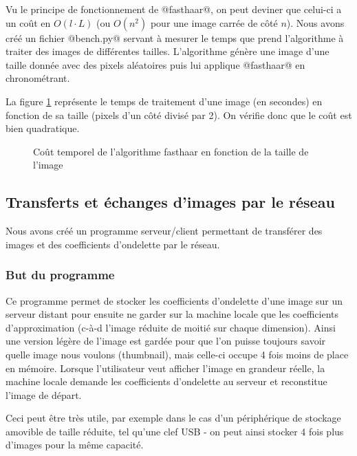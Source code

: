 \documentclass{article}
\begin{document}
Vu le principe de fonctionnement de @fasthaar@, on peut deviner que celui-ci a un coût en $O(l\cdot L)$ (ou $O(n^2)$ pour une image carrée de côté $n$). Nous avons créé un fichier @bench.py@ servant à mesurer le temps que prend l'algorithme à traiter des images de différentes tailles. L'algorithme génère une image d'une taille donnée avec des pixels aléatoires puis lui applique @fasthaar@ en chronométrant. 

La figure \ref{bench1} représente le temps de traitement d'une image (en secondes) en fonction de sa taille (pixels d'un côté divisé par 2). On vérifie donc que le coût est bien quadratique. 

\begin{figure}[!h]
\begin{center}


\caption{Coût temporel de l'algorithme fasthaar en fonction de la taille de l'image}
\label{bench1}
\end{center}
\end{figure}

\clearpage


\subsection{Transferts et échanges d'images par le réseau}
\label{net}
Nous avons créé un programme serveur/client permettant de transférer des images et des coefficients d'ondelette par le réseau.

\subsubsection{But du programme}


Ce programme permet de stocker les coefficients d'ondelette d'une image sur un serveur distant pour ensuite ne garder sur la machine locale que les coefficients d'approximation (c-à-d l'image réduite de moitié sur chaque dimension). Ainsi une version légère de l'image est gardée pour que l'on puisse toujours savoir quelle image nous voulons (thumbnail), mais celle-ci occupe 4 fois moins de place en mémoire. Lorsque l'utilisateur veut afficher l'image en grandeur réelle, la machine locale demande les coefficients d'ondelette au serveur et reconstitue l'image de départ.

Ceci peut être très utile, par exemple dans le cas d'un périphérique de stockage amovible de taille réduite, tel qu'une clef USB - on peut ainsi stocker 4 fois plus d'images pour la même capacité.
\end{document}
